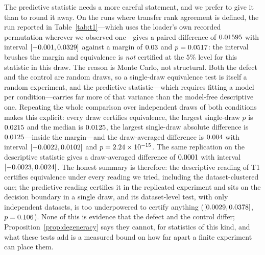 \documentclass[a4paper,fleqn]{cas-sc}
\begin{document}
The predictive statistic needs a more careful statement, and we prefer to give it
than to round it away. On the \NumTaskOneTransferTostN{} runs where transfer rank
agreement is defined, the run reported in Table~\ref{tab:t1}---which uses the
loader's own recorded permutation wherever we observed one---gives a paired
difference of $0.01595{}$ with interval
$[-0.001{}, 0.0329{}]$ against a margin
of $0.03{}$ and $p = 0.0517{}$: the
interval brushes the margin and equivalence is \emph{not} certified at the $5\%$
level for this statistic in this draw. The reason is Monte Carlo, not structural.
Both the defect and the control are random draws, so a single-draw equivalence test
is itself a random experiment, and the predictive statistic---which requires
fitting a model per condition---carries far more of that variance than the
model-free descriptive one. Repeating the whole comparison over \NumEqDraws{}
independent draws of both conditions makes this explicit: every draw certifies
equivalence, the largest single-draw $p$ is $0.0215{}$ and the
median is $0.0125{}$, the largest single-draw absolute
difference is $0.0125{}$---inside the margin---and the
draw-averaged difference is $0.004{}$ with interval
$[-0.0022{}, 0.0102{}]$ and
$p = 2.24\times 10^{-15}{}$. The same replication on the descriptive statistic
gives a draw-averaged difference of $0.0001{}$ with interval
$[-0.0023{}, 0.0024{}]$. The honest summary is therefore:
the descriptive reading of T1 certifies equivalence under every reading we tried,
including the dataset-clustered one; the predictive reading certifies it in the
replicated experiment and sits on the decision boundary in a single draw, and its
dataset-level test, with only \NumTaskOneTostClusters{} independent datasets,
is too underpowered to certify anything
($[0.0029{}, 0.0378{}]$,
$p = 0.106{}$). None of this is evidence that the defect
and the control differ; Proposition~\ref{prop:degeneracy} says they cannot, for
statistics of this kind, and what these tests add is a measured bound on how far
apart a finite experiment can place them.
\end{document}
